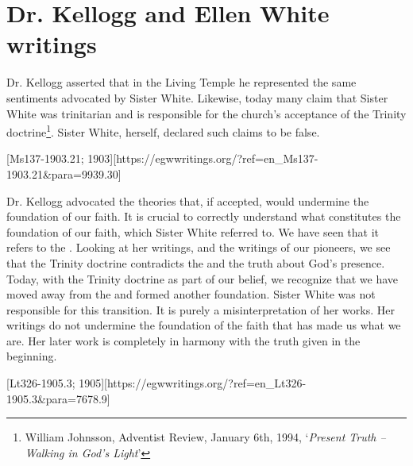 \chapter{Dr. Kellogg and Ellen White writings}

Dr. Kellogg asserted that in the Living Temple he represented the same sentiments advocated by Sister White. Likewise, today many claim that Sister White was trinitarian and is responsible for the church's acceptance of the Trinity doctrine\footnote{William Johnsson, Adventist Review, January 6th, 1994, ‘\textit{Present Truth –Walking in God’s Light}’}. Sister White, herself, declared such claims to be false.

[Ms137-1903.21; 1903][https://egwwritings.org/?ref=en\_Ms137-1903.21&para=9939.30]

Dr. Kellogg advocated the theories that, if accepted, would undermine the foundation of our faith. It is crucial to correctly understand what constitutes the foundation of our faith, which Sister White referred to. We have seen that it refers to the . Looking at her writings, and the writings of our pioneers, we see that the Trinity doctrine contradicts the  and the truth about God’s presence. Today, with the Trinity doctrine as part of our belief, we recognize that we have moved away from the  and formed another foundation. Sister White was not responsible for this transition. It is purely a misinterpretation of her works. Her writings do not undermine the foundation of the faith that has made us what we are. Her later work is completely in harmony with the truth given in the beginning.

[Lt326-1905.3; 1905][https://egwwritings.org/?ref=en\_Lt326-1905.3&para=7678.9]

